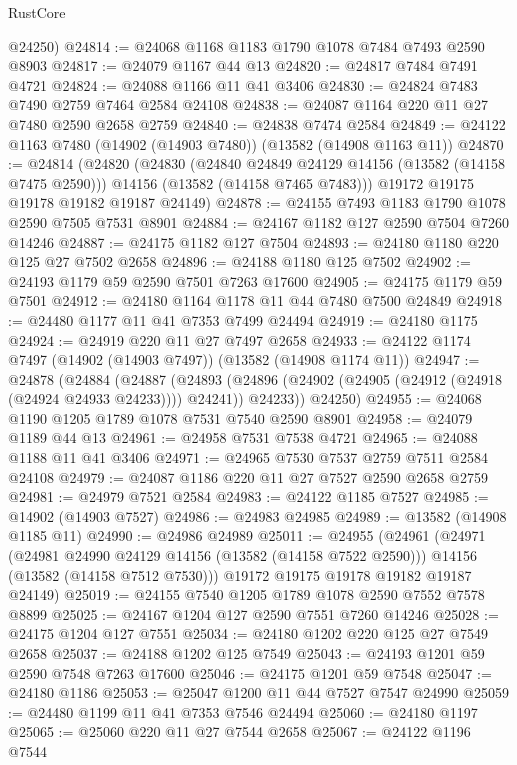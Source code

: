 \begin{lexlean}{RustCore}
\begin{coremodule}
      @24250)
@24814 := @24068 @1168 @1183 @1790 @1078 @7484 @7493 @2590 @8903
@24817 := @24079 @1167 @44 @13
@24820 := @24817 @7484 @7491 @4721
@24824 := @24088 @1166 @11 @41 @3406
@24830 := @24824 @7483 @7490 @2759 @7464 @2584 @24108
@24838 := @24087 @1164 @220 @11 @27 @7480 @2590 @2658 @2759
@24840 := @24838 @7474 @2584
@24849 := @24122 @1163 @7480 (@14902 (@14903 @7480)) (@13582 (@14908 @1163 @11))
@24870 := @24814
    (@24820
      (@24830
        (@24840 @24849 @24129 @14156 (@13582 (@14158 @7475 @2590)))
        @14156
        (@13582 (@14158 @7465 @7483)))
      @19172
      @19175
      @19178
      @19182
      @19187
      @24149)
@24878 := @24155 @7493 @1183 @1790 @1078 @2590 @7505 @7531 @8901
@24884 := @24167 @1182 @127 @2590 @7504 @7260 @14246
@24887 := @24175 @1182 @127 @7504
@24893 := @24180 @1180 @220 @125 @27 @7502 @2658
@24896 := @24188 @1180 @125 @7502
@24902 := @24193 @1179 @59 @2590 @7501 @7263 @17600
@24905 := @24175 @1179 @59 @7501
@24912 := @24180 @1164 @1178 @11 @44 @7480 @7500 @24849
@24918 := @24480 @1177 @11 @41 @7353 @7499 @24494
@24919 := @24180 @1175
@24924 := @24919 @220 @11 @27 @7497 @2658
@24933 := @24122 @1174 @7497 (@14902 (@14903 @7497)) (@13582 (@14908 @1174 @11))
@24947 := @24878
    (@24884
      (@24887
        (@24893 (@24896 (@24902 (@24905 (@24912 (@24918 (@24924 @24933 @24233)))) @24241)) @24233))
      @24250)
@24955 := @24068 @1190 @1205 @1789 @1078 @7531 @7540 @2590 @8901
@24958 := @24079 @1189 @44 @13
@24961 := @24958 @7531 @7538 @4721
@24965 := @24088 @1188 @11 @41 @3406
@24971 := @24965 @7530 @7537 @2759 @7511 @2584 @24108
@24979 := @24087 @1186 @220 @11 @27 @7527 @2590 @2658 @2759
@24981 := @24979 @7521 @2584
@24983 := @24122 @1185 @7527
@24985 := @14902 (@14903 @7527)
@24986 := @24983 @24985
@24989 := @13582 (@14908 @1185 @11)
@24990 := @24986 @24989
@25011 := @24955
    (@24961
      (@24971
        (@24981 @24990 @24129 @14156 (@13582 (@14158 @7522 @2590)))
        @14156
        (@13582 (@14158 @7512 @7530)))
      @19172
      @19175
      @19178
      @19182
      @19187
      @24149)
@25019 := @24155 @7540 @1205 @1789 @1078 @2590 @7552 @7578 @8899
@25025 := @24167 @1204 @127 @2590 @7551 @7260 @14246
@25028 := @24175 @1204 @127 @7551
@25034 := @24180 @1202 @220 @125 @27 @7549 @2658
@25037 := @24188 @1202 @125 @7549
@25043 := @24193 @1201 @59 @2590 @7548 @7263 @17600
@25046 := @24175 @1201 @59 @7548
@25047 := @24180 @1186
@25053 := @25047 @1200 @11 @44 @7527 @7547 @24990
@25059 := @24480 @1199 @11 @41 @7353 @7546 @24494
@25060 := @24180 @1197
@25065 := @25060 @220 @11 @27 @7544 @2658
@25067 := @24122 @1196 @7544

\end{coremodule}
\end{lexlean}
